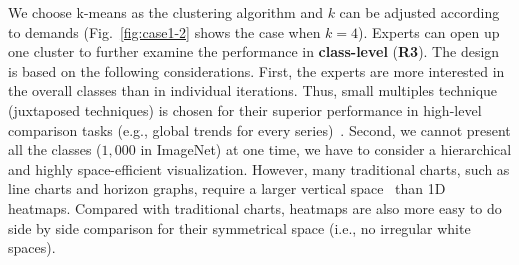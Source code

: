 \documentclass[format=acmsmall, review=false, screen=true]{acmart}
\begin{document}
We choose k-means as the clustering algorithm and $k$ can be adjusted according to demands (Fig.~\ref{fig:case1-2} shows the case when $k=4$).
Experts can open up one cluster to further examine the performance in \textbf{class-level} (\textbf{R3}).
The design is based on the following considerations.
First, the experts are more interested in the overall classes than in individual iterations.
Thus, small multiples technique (juxtaposed techniques) is chosen for their superior performance in high-level comparison tasks (e.g., global trends for every series)~\cite{javed2010graphical}.
Second, we cannot present all the classes ($1,000$ in ImageNet) at one time, we have to consider a hierarchical and highly space-efficient visualization.
However, many traditional charts, such as line charts and horizon graphs, require a larger vertical space~\cite{heer2009sizing} than 1D heatmaps.
Compared with traditional charts, heatmaps are also more easy to do side by side comparison for their symmetrical space (i.e., no irregular white spaces).
\end{document}
